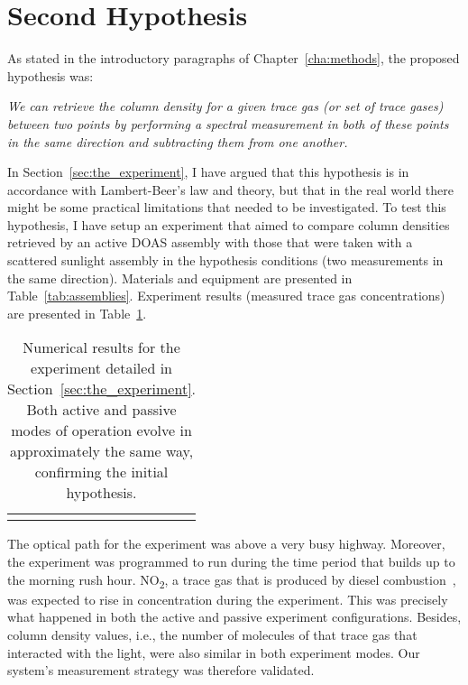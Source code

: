 \section{Second Hypothesis}%
\label{sec:second_hypothesis}

As stated in the introductory paragraphs of Chapter~\ref{cha:methods},
the proposed hypothesis was:

\begin{center}
\end{center}
\begin{center}
    \begin{minipage}{0.8\textwidth}

        \noindent\textit{We can retrieve the column density for a given
        trace gas (or set of trace gases) between two points by
        performing a spectral measurement in both of these points in the
        same direction and subtracting them from one another.}

    \end{minipage}
\end{center}
In Section~\ref{sec:the_experiment}, I have argued that this hypothesis
is in accordance with Lambert-Beer's law and theory, but that in the
real world there might be some practical limitations that needed to be
investigated. To test this hypothesis, I have setup an experiment that
aimed to compare column densities retrieved by an active \gls{DOAS}
assembly with those that were taken with a scattered sunlight assembly
in the hypothesis conditions (two measurements in the same direction).
Materials and equipment are presented in Table~\ref{tab:assemblies}.
Experiment results (measured trace gas concentrations) are presented in
Table~\ref{tab:experiment_results}. 

\begin{table}[htpb]
    \centering
    \caption{Numerical results for the experiment detailed in
    Section~\ref{sec:the_experiment}. Both active and passive modes of
    operation evolve in approximately the same way, confirming the initial
    hypothesis.}
    \label{tab:experiment_results}
    \begin{tabular}{c}
    \missingfigure{}
    \end{tabular}
\end{table}

The optical path for the experiment was above a very busy highway.
Moreover, the experiment was programmed to run during the time period
that builds up to the morning rush hour. NO\textsubscript{2}, a
trace gas that is produced by diesel combustion~, was expected to rise in concentration during the experiment.
This was precisely what happened in both the active and passive
experiment configurations. Besides, column density values, i.e., the
number of molecules of that trace gas that interacted with the light,
were also similar in both experiment modes. Our system's measurement
strategy was therefore validated.

